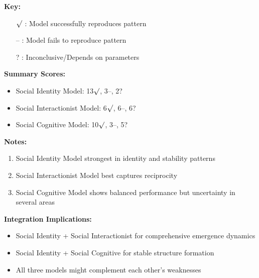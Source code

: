 \documentclass{article}
\begin{document}
\vspace{0.5cm}
\textbf{Key:}
\begin{itemize}
\item[$\surd$] : Model successfully reproduces pattern
\item[--] : Model fails to reproduce pattern
\item[?] : Inconclusive/Depends on parameters
\end{itemize}

\vspace{0.3cm}
\textbf{Summary Scores:}
\begin{itemize}
\item Social Identity Model: 13$\surd$, 3--, 2?
\item Social Interactionist Model: 6$\surd$, 6--, 6?
\item Social Cognitive Model: 10$\surd$, 3--, 5?
\end{itemize}

\vspace{0.3cm}
\textbf{Notes:}
\begin{enumerate}
\item Social Identity Model strongest in identity and stability patterns
\item Social Interactionist Model best captures reciprocity
\item Social Cognitive Model shows balanced performance but uncertainty in several areas
\end{enumerate}

\vspace{0.3cm}
\textbf{Integration Implications:}
\begin{itemize}
\item Social Identity + Social Interactionist for comprehensive emergence dynamics
\item Social Identity + Social Cognitive for stable structure formation
\item All three models might complement each other's weaknesses
\end{itemize}
\end{document}
